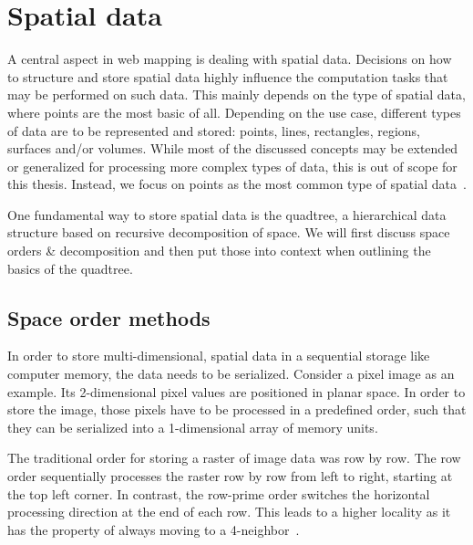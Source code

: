 
%
%

\section{Spatial data}

A central aspect in web mapping is dealing with spatial data. Decisions on how to structure and store spatial data highly influence the computation tasks that may be performed on such data. This mainly depends on the type of spatial data, where points are the most basic of all. Depending on the use case, different types of data are to be represented and stored: points, lines, rectangles, regions, surfaces and/or volumes. While most of the discussed concepts may be extended or generalized for processing more complex types of data, this is out of scope for this thesis. Instead, we focus on points as the most common type of spatial data~\cite{Samet90spatialdata}.

One fundamental way to store spatial data is the quadtree, a hierarchical data structure based on recursive decomposition of space. We will first discuss space orders \& decomposition and then put those into context when outlining the basics of the quadtree.


\subsection{Space order methods}
\label{chapter:space-order}

In order to store multi-dimensional, spatial data in a sequential storage like computer memory, the data needs to be serialized. Consider a pixel image as an example. Its 2-dimensional pixel values are positioned in planar space. In order to store the image, those pixels have to be processed in a predefined order, such that they can be serialized into a 1-dimensional array of memory units.

The traditional order for storing a raster of image data was row by row. The row order sequentially processes the raster row by row from left to right, starting at the top left corner. In contrast, the row-prime order switches the horizontal processing direction at the end of each row. This leads to a higher locality as it has the property of always moving to a 4-neighbor~\cite{Goodchild83raster}.

